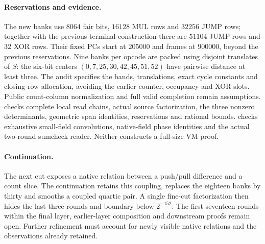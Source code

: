 \documentclass[11pt]{article}
\begin{document}
\paragraph{Reservations and evidence.} The new banks use $8064$ fair bits, $16128$ MUL rows and $32256$ JUMP rows; together with the previous terminal construction there are $51104$ JUMP rows and $32$ XOR rows. Their fixed PCs start at $205000$ and frames at $900000$, beyond the previous reservations. Nine banks per opcode are packed using disjoint translates of $S$: the six-bit centers $(0,7,25,30,42,45,51,52)$ have pairwise distance at least three. The audit specifies the bands, translations, exact cycle constants and closing-row allocation, avoiding the earlier counter, occupancy and XOR slots. Public count-column normalization and full valid completion remain assumptions.  checks complete local read chains, actual source factorization, the three nonzero determinants, geometric span identities, reservations and rational bounds.  checks exhaustive small-field convolutions, native-field phase identities and the actual two-round sumcheck reader. Neither constructs a full-size VM proof.

\paragraph{Continuation.} The next cut exposes a native relation between a push/pull difference and a count slice. The continuation  retains this coupling, replaces the eighteen banks by thirty and smooths a coupled quartic pair. A single fine-cut factorization then hides the last three rounds and boundary below $2^{-152}$. The first seventeen rounds within the final layer, earlier-layer composition and downstream proofs remain open. Further refinement must account for newly visible native relations and the observations already retained.
\end{document}
